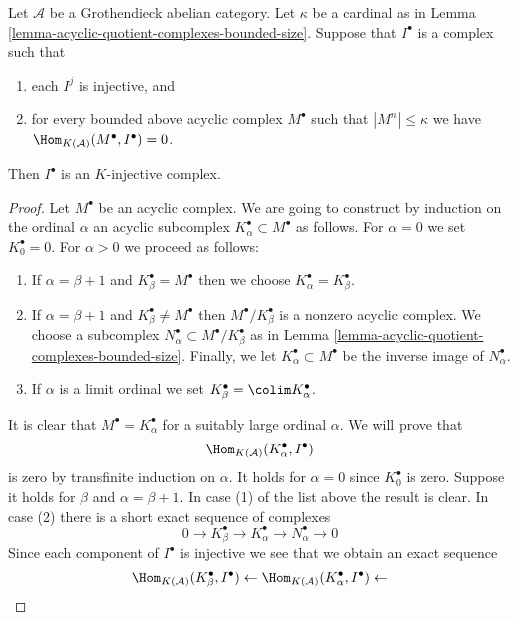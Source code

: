 \begin{lemma}
\label{lemma-characterize-K-injective}
Let $\mathcal{A}$ be a Grothendieck abelian category.
Let $\kappa$ be a cardinal as in
Lemma \ref{lemma-acyclic-quotient-complexes-bounded-size}.
Suppose that $I^\bullet$ is a complex such that
\begin{enumerate}
\item each $I^j$ is injective, and
\item for every bounded above acyclic complex $M^\bullet$
such that $|M^n| \leq \kappa$
we have $\Hom_{K(\mathcal{A})}(M^\bullet, I^\bullet) = 0$.
\end{enumerate}
Then $I^\bullet$ is an $K$-injective complex.
\end{lemma}

\begin{proof}
Let $M^\bullet$ be an acyclic complex. We are going to construct by
induction on the ordinal $\alpha$ an acyclic subcomplex
$K_\alpha^\bullet \subset M^\bullet$ as follows.
For $\alpha = 0$ we set $K_0^\bullet = 0$. For $\alpha > 0$
we proceed as follows:
\begin{enumerate}
\item If $\alpha = \beta + 1$ and $K_\beta^\bullet = M^\bullet$
then we choose $K_\alpha^\bullet = K_\beta^\bullet$.
\item If $\alpha = \beta + 1$ and $K_\beta^\bullet \not = M^\bullet$
then $M^\bullet/K_\beta^\bullet$ is a nonzero acyclic complex.
We choose a subcomplex $N_\alpha^\bullet \subset M^\bullet/K_\beta^\bullet$
as in Lemma \ref{lemma-acyclic-quotient-complexes-bounded-size}.
Finally, we let $K_\alpha^\bullet \subset M^\bullet$
be the inverse image of $N_\alpha^\bullet$.
\item If $\alpha$ is a limit ordinal we set
$K_\beta^\bullet = \colim K_\alpha^\bullet$.
\end{enumerate}
It is clear that $M^\bullet = K_\alpha^\bullet$ for a suitably large
ordinal $\alpha$. We will prove that
$$
\Hom_{K(\mathcal{A})}(K_\alpha^\bullet, I^\bullet)
$$
is zero by transfinite induction on $\alpha$. It holds for $\alpha = 0$
since $K_0^\bullet$ is zero. Suppose it holds for $\beta$ and
$\alpha = \beta + 1$. In case (1) of the list above the result is clear.
In case (2) there is a short exact sequence of complexes
$$
0 \to K_\beta^\bullet \to K_\alpha^\bullet \to N_\alpha^\bullet \to 0
$$
Since each component of $I^\bullet$ is injective we see that we obtain
an exact sequence
$$
\Hom_{K(\mathcal{A})}(K_\beta^\bullet, I^\bullet) \leftarrow
\Hom_{K(\mathcal{A})}(K_\alpha^\bullet, I^\bullet) \leftarrow
$$
\end{proof}
